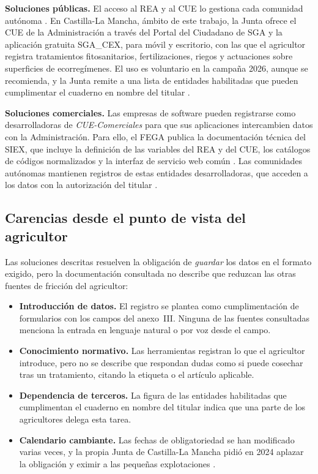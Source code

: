 \textbf{Soluciones públicas.} El acceso al REA y al CUE lo gestiona cada comunidad autónoma \citep{fega-acceso-rea-cue}. En Castilla-La Mancha, ámbito de este trabajo, la Junta ofrece el CUE de la Administración a través del Portal del Ciudadano de SGA y la aplicación gratuita SGA\_CEX, para móvil y escritorio, con las que el agricultor registra tratamientos fitosanitarios, fertilizaciones, riegos y actuaciones sobre superficies de ecorregímenes. El uso es voluntario en la campaña 2026, aunque se recomienda, y la Junta remite a una lista de entidades habilitadas que pueden cumplimentar el cuaderno en nombre del titular \citep{jccm-apliagri-cue}.

\textbf{Soluciones comerciales.} Las empresas de software pueden registrarse como desarrolladoras de \emph{CUE-Comerciales} para que sus aplicaciones intercambien datos con la Administración. Para ello, el FEGA publica la documentación técnica del SIEX, que incluye la definición de las variables del REA y del CUE, los catálogos de códigos normalizados y la interfaz de servicio web común \citep{fega-doc-tecnica-siex}. Las comunidades autónomas mantienen registros de estas entidades desarrolladoras, que acceden a los datos con la autorización del titular \citep{fega-acceso-rea-cue,fega-doc-tecnica-siex}. 

\subsection{Carencias desde el punto de vista del agricultor}\label{subsec:Carencias}

Las soluciones descritas resuelven la obligación de \emph{guardar} los datos en el formato exigido, pero la documentación consultada no describe que reduzcan las otras fuentes de fricción del agricultor:
\begin{itemize}
	\item \textbf{Introducción de datos.} El registro se plantea como cumplimentación de formularios con los campos del anexo~III. Ninguna de las fuentes consultadas menciona la entrada en lenguaje natural o por voz desde el campo.
	\item \textbf{Conocimiento normativo.} Las herramientas registran lo que el agricultor introduce, pero no se describe que respondan dudas como si puede cosechar tras un tratamiento, citando la etiqueta o el artículo aplicable.
	\item \textbf{Dependencia de terceros.} La figura de las entidades habilitadas que cumplimentan el cuaderno en nombre del titular \citep{jccm-apliagri-cue} indica que una parte de los agricultores delega esta tarea.
	\item \textbf{Calendario cambiante.} Las fechas de obligatoriedad se han modificado varias veces, y la propia Junta de Castilla-La Mancha pidió en 2024 aplazar la obligación y eximir a las pequeñas explotaciones \citep{cmmedia2024aplazamiento}.
\end{itemize}

